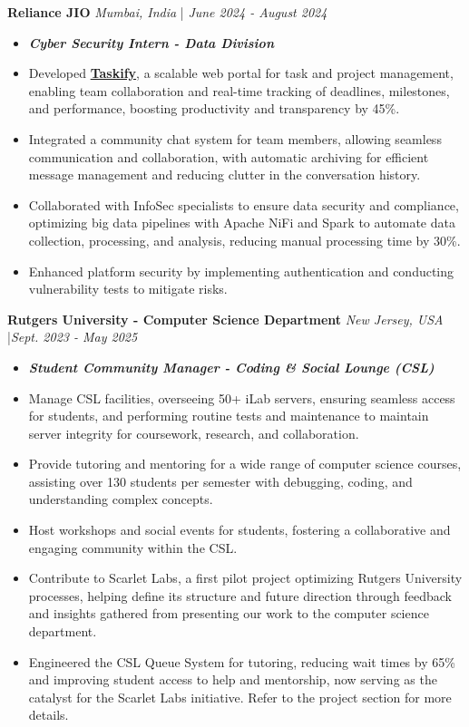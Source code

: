 \documentclass[a4paper]{article}
\begin{document}
\textbf{Reliance JIO} \hfill  \textit{Mumbai, India} | \textit{June 2024 - August 2024}
\vspace{-2.5mm}
\begin{itemize} \itemsep -4pt \item[] \textit{\textbf{Cyber Security Intern - Data Division}}
\item Developed \textbf{\href{https://github.com/ShatakshiRanjan/JIOWebDesign}{Taskify}}, a scalable web portal for task and project management, enabling team collaboration and real-time tracking of deadlines, milestones, and performance, boosting productivity and transparency by 45\%.
\item Integrated a community chat system for team members, allowing seamless communication and collaboration, with automatic archiving for efficient message management and reducing clutter in the conversation history.
\item Collaborated with InfoSec specialists to ensure data security and compliance, optimizing big data pipelines with Apache NiFi and Spark to automate data collection, processing, and analysis, reducing manual processing time by 30\%.
\item Enhanced platform security by implementing authentication and conducting vulnerability tests to mitigate risks.
\end{itemize}
\vspace{-2mm}
\textbf{Rutgers University - Computer Science Department} \hfill \textit{New Jersey, USA} |\textit{Sept. 2023 - May 2025}
\vspace{-2.5mm}
\begin{itemize} \itemsep -4pt
    \item[] \textit{\textbf{Student Community Manager - Coding \& Social Lounge (CSL)}}
    \item Manage CSL facilities, overseeing 50+ iLab servers, ensuring seamless access for students, and performing routine tests and maintenance to maintain server integrity for coursework, research, and collaboration.
    \item Provide tutoring and mentoring for a wide range of computer science courses, assisting over 130 students per semester with debugging, coding, and understanding complex concepts. 
    \item Host workshops and social events for students, fostering a collaborative and engaging community within the CSL.
    \item Contribute to Scarlet Labs, a first pilot project optimizing Rutgers University processes, helping define its structure and future direction through feedback and insights gathered from presenting our work to the computer science department.
    \item Engineered the CSL Queue System for tutoring, reducing wait times by 65\% and improving student access to help and mentorship, now serving as the catalyst for the Scarlet Labs initiative. Refer to the project section for more details. 
\end{itemize}
\end{document}
